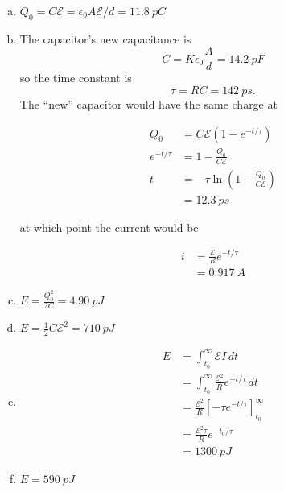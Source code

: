 \documentclass{article}
\begin{document}
\begin{enumerate}[(a)]
  \item $Q_0 = C \mathcal{E} = \epsilon_0 A \mathcal{E} / d = \qty{11.8}{pC}$

  \item The capacitor's new capacitance is \[C = K \epsilon_0 \frac{A}{d} = \qty{14.2}{pF}\] so the time constant is \[\tau = R C = \qty{142}{ps}.\] The ``new'' capacitor would have the same charge at

        \begin{align*}
          Q_0           & = C \mathcal{E} (1 - e^{-t / \tau})                      \\
          e^{-t / \tau} & = 1 - \frac{Q_0}{C \mathcal{E}}                          \\
          t             & = -\tau \ln \left( 1 - \frac{Q_0}{C \mathcal{E}} \right) \\
                        & = \qty{12.3}{ps}
        \end{align*}

        at which point the current would be

        \begin{align*}
          i & = \frac{\mathcal{E}}{R} e^{-t / \tau} \\
            & = \qty{0.917}{A}
        \end{align*}

  \item $E = \frac{Q_0^2}{2 C} = \qty{4.90}{pJ}$

  \item $E = \frac{1}{2} C \mathcal{E}^2 = \qty{710}{pJ}$

  \item

        \begin{align*}
          E & = \int_{t_0}^\infty \mathcal{E} I \,dt                         \\
            & = \int_{t_0}^\infty \frac{\mathcal{E}^2}{R} e^{-t / \tau} \,dt \\
            & = \frac{\mathcal{E}^2}{R} [-\tau e^{-t / \tau}]_{t_0}^\infty   \\
            & = \frac{\mathcal{E}^2 \tau}{R} e^{-t_0 / \tau}                 \\
            & = \qty{1300}{pJ}
        \end{align*}

  \item $E = \qty{590}{pJ}$
\end{enumerate}
\end{document}
